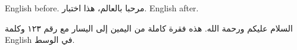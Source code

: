 \documentclass{article}
\begin{document}
English before. \textarabic{مرحبا بالعالم، هذا اختبار.} English after.

\begin{Arabic}
السلام عليكم ورحمة الله. هذه فقرة كاملة من اليمين إلى اليسار مع رقم ١٢٣ وكلمة English في الوسط.
\end{Arabic}
\end{document}
